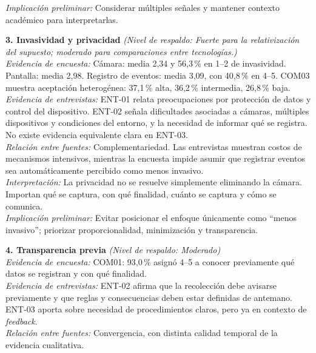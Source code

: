 \begin{center}
\begin{infobox}
\textit{Implicación preliminar:} Considerar múltiples señales y mantener contexto académico para interpretarlas.
\end{infobox}
\vspace{2pt}
\begin{infobox}
\textbf{\textcolor{accent}{3. Invasividad y privacidad}} \textit{(Nivel de respaldo: Fuerte para la relativización del supuesto; moderado para comparaciones entre tecnologías.)}\\
\textit{Evidencia de encuesta:} Cámara: media 2,34 y 56,3\,\% en 1--2 de invasividad. Pantalla: media 2,98. Registro de eventos: media 3,09, con 40,8\,\% en 4--5. COM03 muestra aceptación heterogénea: 37,1\,\% alta, 36,2\,\% intermedia, 26,8\,\% baja.\\
\textit{Evidencia de entrevistas:} ENT-01 relata preocupaciones por protección de datos y control del dispositivo. ENT-02 señala dificultades asociadas a cámaras, múltiples dispositivos y condiciones del entorno, y la necesidad de informar qué se registra. No existe evidencia equivalente clara en ENT-03.\\
\textit{Relación entre fuentes:} Complementariedad. Las entrevistas muestran costos de mecanismos intensivos, mientras la encuesta impide asumir que registrar eventos sea automáticamente percibido como menos invasivo.\\
\textit{Interpretación:} La privacidad no se resuelve simplemente eliminando la cámara. Importan qué se captura, con qué finalidad, cuánto se captura y cómo se comunica.\\
\textit{Implicación preliminar:} Evitar posicionar el enfoque únicamente como ``menos invasivo''; priorizar proporcionalidad, minimización y transparencia.
\end{infobox}
\vspace{2pt}
\begin{infobox}
\textbf{\textcolor{accent}{4. Transparencia previa}} \textit{(Nivel de respaldo: Moderado)}\\
\textit{Evidencia de encuesta:} COM01: 93,0\,\% asignó 4--5 a conocer previamente qué datos se registran y con qué finalidad.\\
\textit{Evidencia de entrevistas:} ENT-02 afirma que la recolección debe avisarse previamente y que reglas y consecuencias deben estar definidas de antemano. ENT-03 aporta sobre necesidad de procedimientos claros, pero ya en contexto de \textit{feedback}.\\
\textit{Relación entre fuentes:} Convergencia, con distinta calidad temporal de la evidencia cualitativa.\\

\end{infobox}
\end{center}
